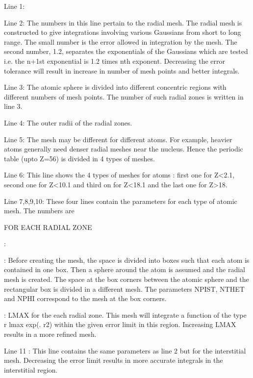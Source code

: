 \documentclass[letterpaper,10pt,english,openany,oneside]{sphinxmanual}
\begin{document}
\sphinxAtStartPar
Line 1:

\sphinxAtStartPar
Line 2: The numbers in this line pertain to the radial mesh. The radial mesh is constructed to give integrations involving various Gaussians from short to long range. The small number is the error allowed in integration by the mesh. The second number, 1.2, separates the exponentials of the Gaussians which are tested i.e. the n+1st exponential is 1.2 times nth exponent. Decreasing the error tolerance will result in increase in number of mesh points and better integrals.

\sphinxAtStartPar
Line 3: The atomic sphere is divided into different concentric regions with different numbers of mesh points. The number of such radial zones is written in line 3.

\sphinxAtStartPar
Line 4: The outer radii of the radial zones.

\sphinxAtStartPar
Line 5: The mesh may be different for different atoms. For example, heavier atoms generally need denser radial meshes
near the nucleus. Hence the periodic table (upto Z=56) is divided in 4 types of meshes.

\sphinxAtStartPar
Line 6: This line shows the 4 types of meshes for atoms : first one for Z\textless{}2.1, second one for Z\textless{}10.1 and third on for Z\textless{}18.1 and the last one for Z\textgreater{}18.

\sphinxAtStartPar
Line 7,8,9,10: These four lines contain the parameters for each type of atomic mesh. The numbers are

\sphinxAtStartPar
{} FOR EACH RADIAL ZONE

\sphinxAtStartPar
{} :

\sphinxAtStartPar
{} : Before creating the mesh, the space is divided into boxes such that each atom is contained in one box. Then a sphere around the atom is assumed and the radial mesh is created. The space at the box corners between the atomic sphere and the rectangular box is divided in a different mesh. The parameters NPIST, NTHET and NPHI correspond to the mesh at the box corners.

\sphinxAtStartPar
{} : LMAX for the each radial zone. This mesh will integrate a function of the type r lmax exp(\sphinxhyphen{}. r2) within the given error limit in this region. Increasing LMAX results in a more refined mesh.

\sphinxAtStartPar
Line 11 : This line contains the same parameters as line 2 but for the interstitial mesh. Decreasing the error limit results in more accurate integrals in the interstitial region.
\end{document}
